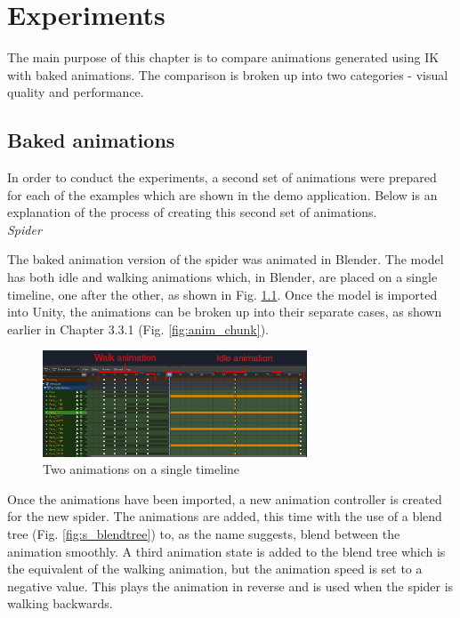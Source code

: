 \chapter{Experiments}
The main purpose of this chapter is to compare animations generated using IK
with baked animations. The comparison is broken up into two categories - visual
quality and performance. 

\section{Baked animations}
 In order to conduct the experiments, a second set of animations were prepared
 for each of the examples which are shown in the demo application. Below is an
 explanation of the process of creating this second set of animations. \\

\noindent\textit{Spider}

The baked animation version of the spider was animated in Blender. The model
has both idle and walking animations which, in Blender, are placed on
a single timeline, one after the other, as shown in Fig. \ref{fig:timeline}.
Once the model is imported into Unity, the animations can be broken up into
their separate cases, as shown earlier in Chapter 3.3.1 (Fig.
\ref{fig:anim_chunk}). 

\begin{figure}[h!]
    \centering
    \includegraphics[width=0.7\textwidth]{grafika/blender_timeline.eps}
    \caption{Two animations on a single timeline}
    \label{fig:timeline}
\end{figure}

Once the animations have been imported, a new animation controller is created
for the new spider. The animations are added, this time with the use of a blend
tree (Fig. \ref{fig:s_blendtree}) to, as the name suggests, blend between the
animation smoothly. A third animation state is added to the blend tree
which is the equivalent of the walking animation, but the animation speed is set
to a negative value. This plays the animation in reverse and is used when the
spider is walking backwards. 


